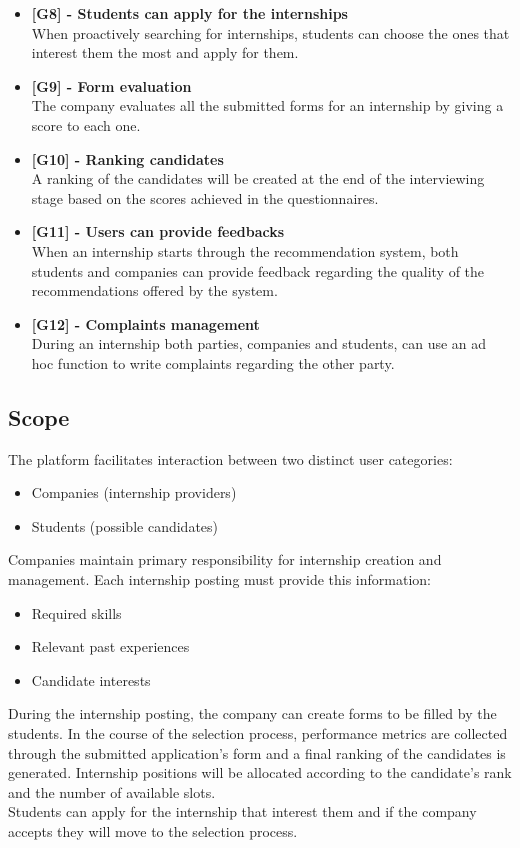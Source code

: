 \documentclass[11pt,twoside]{article}
\begin{document}
\begin{itemize}
\item \textbf{[G8] - Students can apply for the internships} \\
When proactively searching for internships, students can choose the ones that interest them the most and apply for them.
\item \textbf{[G9] - Form evaluation} \\
The company evaluates all the submitted forms for an internship by giving a score to each one.
\item \textbf{[G10] - Ranking candidates} \\
A ranking of the candidates will be created at the end of the interviewing stage based on the scores achieved in the questionnaires.
\item \textbf{[G11] - Users can provide feedbacks} \\
When an internship starts through the recommendation system, both students and companies can provide feedback regarding the quality of the recommendations offered by the system.
\item \textbf{[G12] - Complaints management} \\
During an internship both parties, companies and students, can use an ad hoc function to write complaints regarding the other party.
\end{itemize}

	\subsection{Scope}
	The platform facilitates interaction between two distinct user categories:
\begin{itemize}
	\item Companies (internship providers)
	\item Students (possible candidates)
\end{itemize}
Companies maintain primary responsibility for internship creation and management. Each internship posting must provide this information:
\begin{itemize}
	\item Required skills
	\item Relevant past experiences
	\item Candidate interests
\end{itemize}
During the internship posting, the company can create forms to be filled by the students. In the course of the selection process, performance metrics are collected through the submitted application's form and a final ranking of the candidates is generated. Internship positions will be allocated according to the candidate's rank and the number of available slots. \\
Students can apply for the internship that interest them and if the company accepts they will move to the selection process.
\end{document}
